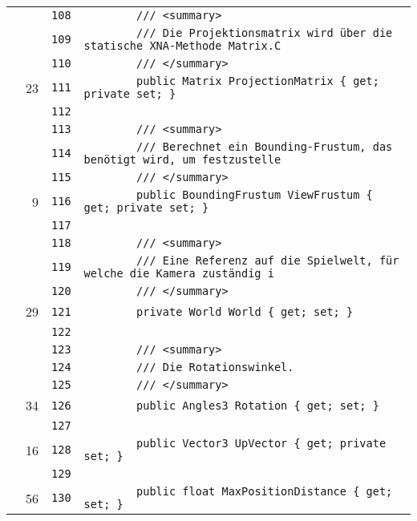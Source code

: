 \documentclass[a4paper,10pt]{article}
\begin{document}
\begin{longtable}[l]{lrrl}
\cellcolor{gray} &  & \verb~108~ & \verb~        /// <summary>~\\
\cellcolor{gray} &  & \verb~109~ & \verb~        /// Die Projektionsmatrix wird über die statische XNA-Methode Matrix.C~\\
\cellcolor{gray} &  & \verb~110~ & \verb~        /// </summary>~\\
\cellcolor{green} & 23 & \verb~111~ & \verb~        public Matrix ProjectionMatrix { get; private set; }~\\
\cellcolor{gray} &  & \verb~112~ & \verb~~\\
\cellcolor{gray} &  & \verb~113~ & \verb~        /// <summary>~\\
\cellcolor{gray} &  & \verb~114~ & \verb~        /// Berechnet ein Bounding-Frustum, das benötigt wird, um festzustelle~\\
\cellcolor{gray} &  & \verb~115~ & \verb~        /// </summary>~\\
\cellcolor{green} & 9 & \verb~116~ & \verb~        public BoundingFrustum ViewFrustum { get; private set; }~\\
\cellcolor{gray} &  & \verb~117~ & \verb~~\\
\cellcolor{gray} &  & \verb~118~ & \verb~        /// <summary>~\\
\cellcolor{gray} &  & \verb~119~ & \verb~        /// Eine Referenz auf die Spielwelt, für welche die Kamera zuständig i~\\
\cellcolor{gray} &  & \verb~120~ & \verb~        /// </summary>~\\
\cellcolor{green} & 29 & \verb~121~ & \verb~        private World World { get; set; }~\\
\cellcolor{gray} &  & \verb~122~ & \verb~~\\
\cellcolor{gray} &  & \verb~123~ & \verb~        /// <summary>~\\
\cellcolor{gray} &  & \verb~124~ & \verb~        /// Die Rotationswinkel.~\\
\cellcolor{gray} &  & \verb~125~ & \verb~        /// </summary>~\\
\cellcolor{green} & 34 & \verb~126~ & \verb~        public Angles3 Rotation { get; set; }~\\
\cellcolor{gray} &  & \verb~127~ & \verb~~\\
\cellcolor{green} & 16 & \verb~128~ & \verb~        public Vector3 UpVector { get; private set; }~\\
\cellcolor{gray} &  & \verb~129~ & \verb~~\\
\cellcolor{green} & 56 & \verb~130~ & \verb~        public float MaxPositionDistance { get; set; }~\\

\end{longtable}
\end{document}
